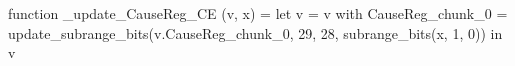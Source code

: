 function _update_CauseReg_CE (v, x) = let v = { v with CauseReg_chunk_0 = update_subrange_bits(v.CauseReg_chunk_0, 29, 28, subrange_bits(x, 1, 0)) } in
  v
